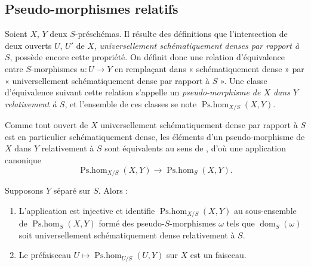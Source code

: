\subsection{Pseudo-morphismes relatifs}

\begin{env}[20.5.1]
Soient $X$, $Y$ deux $S$-préschémas.
Il résulte des définitions  que l'intersection de deux ouverts $U$, $U'$ de $X$, \emph{universellement schématiquement denses par rapport à $S$}, possède encore cette propriété.
On définit donc une relation d'équivalence entre $S$-morphismes $u:U\to Y$ en remplaçant dans  « schématiquement dense » par « universellement schématiquement dense par rapport à $S$ ».
Une classe d'équivalence suivant cette relation s'appelle un \emph{pseudo-morphisme de $X$ dans $Y$ relativement à $S$}, et l'ensemble de ces classes se note $\operatorname{Ps.hom}_{X/S}(X,Y)$.
\end{env}

\begin{env}[20.5.2]
\label{IV.20.5.2}
Comme tout ouvert de $X$ universellement schématiquement dense par rapport à $S$ est en particulier schématiquement dense, les éléments d'un pseudo-morphisme
de $X$ dans $Y$ relativement à $S$ sont équivalents au sens de , d'où une application canonique
\[
\label{IV.20.5.2.1}
  \operatorname{Ps.hom}_{X/S}(X,Y)\to\operatorname{Ps.hom}_S(X,Y).
  \tag{20.5.2.1}
\]
\end{env}

\begin{proposition}[20.5.3]
\label{IV.20.5.3}
Supposons $Y$ séparé sur $S$.
Alors :
\begin{enumerate}[label=\emph{(\roman*)}]
  \item L'application  est injective et identifie $\operatorname{Ps.hom}_{X/S}(X,Y)$ au sous-ensemble de $\operatorname{Ps.hom}_S(X,Y)$ formé des pseudo-$S$-morphismes $\omega$ tels que $\operatorname{dom}_S(\omega)$ soit universellement schématiquement dense relativement à $S$.
  \item Le préfaisceau $U\mapsto\operatorname{Ps.hom}_{U/S}(U,Y)$ sur $X$ est un faisceau.
\end{enumerate}
\end{proposition}

